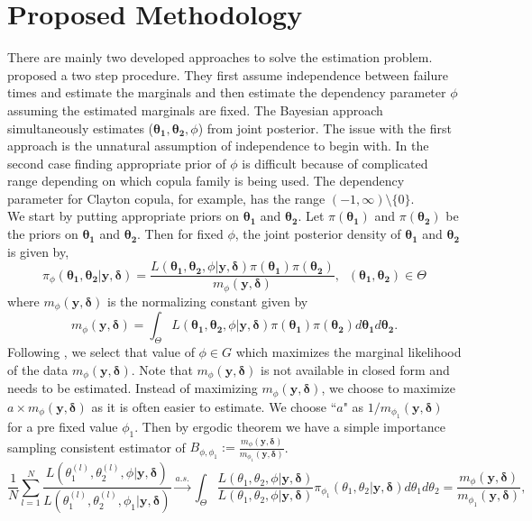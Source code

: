 \documentclass[11pt]{article}
\theoremstyle{remboldstyle}
\newcommand{\y}{{\boldsymbol{y}}}
\newcommand{\de}{{\boldsymbol{\delta}}}
\begin{document}
\section{Proposed Methodology}
\label{sec:method}
\noindent
There are mainly two developed approaches to solve the estimation problem. \cite{shih:louis:1995} proposed a two step procedure.  They first assume independence between failure times and estimate the marginals and then estimate the dependency parameter $\phi$ assuming the estimated marginals are fixed. The Bayesian approach simultaneously estimates ($\mathbf{\theta_1}, \mathbf{\theta_2}, \phi$) from joint posterior. The issue with the first approach is the unnatural assumption of independence to begin with. In the second case finding appropriate prior of $\phi$  is difficult because of complicated range depending on which copula family is being used. The dependency parameter for Clayton copula, for example, has the range $ (-1, \infty)\setminus \{0\}$. \\
We start by putting appropriate priors on $\mathbf{\theta_1}$ and $\mathbf{\theta_2}$. Let $\pi(\mathbf{\theta_1})$ and $\pi(\mathbf{\theta_2})$ be the priors on $\mathbf{\theta_1}$ and $\mathbf{\theta_2}$. Then for fixed $\phi$, the joint posterior density of $\mathbf{\theta_1}$ and $\mathbf{\theta_2}$ is given by,
\begin{equation}
  \label{eq:post}
  \pi_\phi(\mathbf{\theta_1}, \mathbf{\theta_2} | \y, \de) = \frac{L(\mathbf{\theta_1}, \mathbf{\theta_2}, \phi| \y, \de) \pi(\mathbf{\theta_1})
\pi(\mathbf{\theta_2})}{m_{\phi}(\y, \de)}, \;\;(\mathbf{\theta_1}, \mathbf{\theta_2}) \in \Theta
\end{equation}
where $m_{\phi}(\y, \de)$ is the normalizing constant given by
\[
m_{\phi}(\y, \de) = \int_{\Theta} L(\mathbf{\theta_1}, \mathbf{\theta_2}, \phi| \y, \de) \pi(\mathbf{\theta_1})\pi(\mathbf{\theta_2}) d\mathbf{\theta_1} d\mathbf{\theta_2}.
\]
Following \cite{roy:2014}, we select that value of $\phi \in G$ which maximizes the marginal likelihood of the data $m_{\phi}(\y, \de)$. Note that $m_{\phi}(\y, \de)$ is not available in closed form and needs to be estimated. Instead of maximizing $m_{\phi}(\y, \de)$, we choose to maximize $a \times m_{\phi}(\y, \de)$ as it is often easier to estimate. We choose ``$a$" as $1/m_{\phi_1}(\y, \de)$ for a pre fixed value $\phi_1$. Then by ergodic theorem we have a simple importance sampling consistent estimator of $B_{\phi,\phi_1}:= \frac{m_{\phi}(\y, \de)}{m_{\phi_1}(\y, \de)}$.
\begin{equation}
  \label{eq:simbf}
\frac{1}{N} \sum_{l=1}^N \frac{L(\theta_1^{(l)}, \theta_2^{(l)}, \phi| \y, \de)}{L(\theta_1^{(l)}, \theta_2^{(l)}, \phi_1| \y, \de)} \stackrel{a.s.}{\rightarrow} \int_{\Theta} \frac{L(\theta_1, \theta_2, \phi| \y, \de)}{L(\theta_1, \theta_2, \phi| \y, \de)} \pi_{\phi_1}(\theta_1, \theta_2| \y, \de) d\theta_1 d\theta_2 =\frac{m_{\phi}(\y, \de)}{m_{\phi_1}(\y, \de)},
\end{equation}
\end{document}
